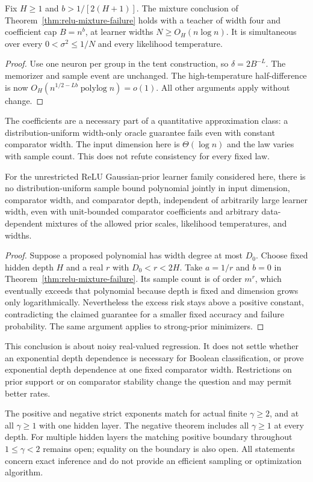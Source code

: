 \begin{corollary}
Fix $H\ge1$ and $b>1/[2(H+1)]$. The mixture conclusion of
Theorem~\ref{thm:relu-mixture-failure} holds with a teacher of width
four and coefficient cap $B=n^b$, at learner widths
$N\ge O_H(n\log n)$. It is simultaneous over every
$0<\sigma^2\le1/N$ and every likelihood temperature.
\end{corollary}
\begin{proof}
Use one neuron per group in the tent construction, so
$\delta=2B^{-L}$. The memorizer and sample event are unchanged.
The high-temperature half-difference is now
$O_H(n^{1/2-Lb}\operatorname{polylog}n)=o(1)$.
All other arguments apply without change.
\end{proof}

The coefficients are a necessary part of a quantitative approximation
class: a distribution-uniform width-only oracle guarantee fails even
with constant comparator width. The input dimension here is
$\Theta(\log n)$ and the law varies with sample count. This does not
refute consistency for every fixed law.

\begin{corollary}
For the unrestricted ReLU Gaussian-prior learner family considered
here, there is no distribution-uniform sample bound polynomial jointly
in input dimension, comparator width, and comparator depth, independent
of arbitrarily large learner width, even with unit-bounded comparator
coefficients and arbitrary data-dependent mixtures of the allowed
prior scales, likelihood temperatures, and widths.
\end{corollary}
\begin{proof}
Suppose a proposed polynomial has width degree at most $D_0$.
Choose fixed hidden depth $H$ and a real $r$ with
$D_0<r<2H$. Take $a=1/r$ and $b=0$ in
Theorem~\ref{thm:relu-mixture-failure}. Its sample count is of order
$m^r$, which eventually exceeds that polynomial because depth is
fixed and dimension grows only logarithmically. Nevertheless the
excess risk stays above a positive constant, contradicting the
claimed guarantee for a smaller fixed accuracy and failure
probability. The same argument applies to strong-prior minimizers.
\end{proof}

This conclusion is about noisy real-valued regression. It does not
settle whether an exponential depth dependence is necessary for
Boolean classification, or prove exponential depth dependence at one
fixed comparator width. Restrictions on prior support or on comparator
stability change the question and may permit better rates.

The positive and negative strict exponents match for actual finite
$\gamma\ge2$, and at all $\gamma\ge1$ with one hidden layer. The
negative theorem includes all $\gamma\ge1$ at every depth. For
multiple hidden layers the matching positive boundary throughout
$1\le\gamma<2$ remains open; equality on the boundary is also open.
All statements concern exact inference and do not provide an efficient
sampling or optimization algorithm.
